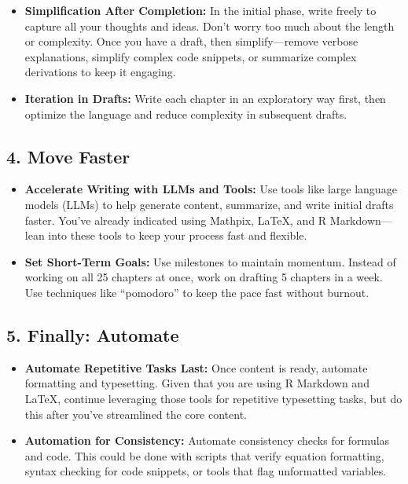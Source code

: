 \documentclass[
  12 pt,
  a4paper,
]{book}
\providecommand{\tightlist}{%
  \setlength{\itemsep}{0pt}\setlength{\parskip}{0pt}}
\numberwithin{equation}{section}
\theoremstyle{plain}      %
\theoremstyle{definition} %
\theoremstyle{remark}     %
\theoremstyle{note}         %
\begin{document}
\begin{itemize}
\tightlist
\item
  \textbf{Simplification After Completion:} In the initial phase, write
  freely to capture all your thoughts and ideas. Don't worry too much
  about the length or complexity. Once you have a draft, then
  simplify---remove verbose explanations, simplify complex code
  snippets, or summarize complex derivations to keep it engaging.
\item
  \textbf{Iteration in Drafts:} Write each chapter in an exploratory way
  first, then optimize the language and reduce complexity in subsequent
  drafts.
\end{itemize}

\hypertarget{move-faster}{%
\subsection*{\texorpdfstring{4. \textbf{Move
Faster}}{4. Move Faster}}\label{move-faster}}

\begin{itemize}
\tightlist
\item
  \textbf{Accelerate Writing with LLMs and Tools:} Use tools like large
  language models (LLMs) to help generate content, summarize, and write
  initial drafts faster. You've already indicated using Mathpix, LaTeX,
  and R Markdown---lean into these tools to keep your process fast and
  flexible.
\item
  \textbf{Set Short-Term Goals:} Use milestones to maintain momentum.
  Instead of working on all 25 chapters at once, work on drafting 5
  chapters in a week. Use techniques like ``pomodoro'' to keep the pace
  fast without burnout.
\end{itemize}

\hypertarget{finally-automate}{%
\subsection*{\texorpdfstring{5. \textbf{Finally:
Automate}}{5. Finally: Automate}}\label{finally-automate}}

\begin{itemize}
\tightlist
\item
  \textbf{Automate Repetitive Tasks Last:} Once content is ready,
  automate formatting and typesetting. Given that you are using R
  Markdown and LaTeX, continue leveraging those tools for repetitive
  typesetting tasks, but do this after you've streamlined the core
  content.
\item
  \textbf{Automation for Consistency:} Automate consistency checks for
  formulas and code. This could be done with scripts that verify
  equation formatting, syntax checking for code snippets, or tools that
  flag unformatted variables.
\end{itemize}
\end{document}
